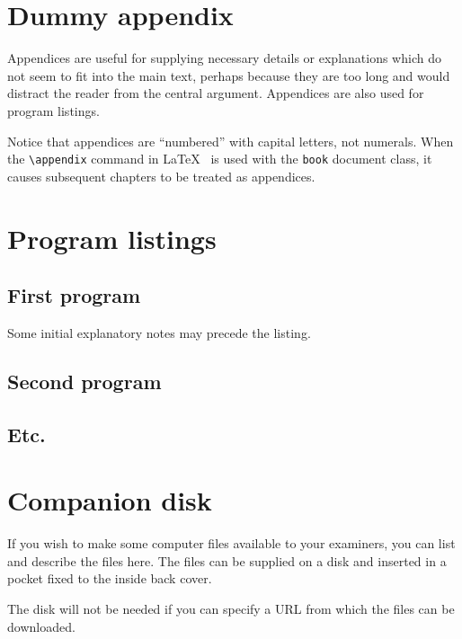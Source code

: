 \documentclass[12pt,openany,a4paper]{book}
\begin{document}

\chapter{Dummy appendix}

Appendices are useful for supplying necessary details or explanations
which do not seem to fit into the main text, perhaps because they are
too long and would distract the reader from the central argument.
Appendices are also used for program listings.

Notice that appendices are ``numbered'' with capital letters, not
numerals.  When the \verb+\appendix+ command in
\LaTeX~\cite[p.\,175]{lamport} is used with the \texttt{book} document
class, it causes subsequent chapters to be treated as appendices.

\chapter{Program listings}

\section{First program}

Some initial explanatory notes may precede the listing.

\section{Second program}

\section{Etc.}

\chapter{Companion disk}

If you wish to make some computer files available to your examiners,
you can list and describe the files here.  The files can be supplied
on a disk and inserted in a pocket fixed to the inside back cover.

The disk will not be needed if you can specify a URL from which the
files can be downloaded.

\cleardoublepage

\newpage
\nocite{*}


\end{document}
